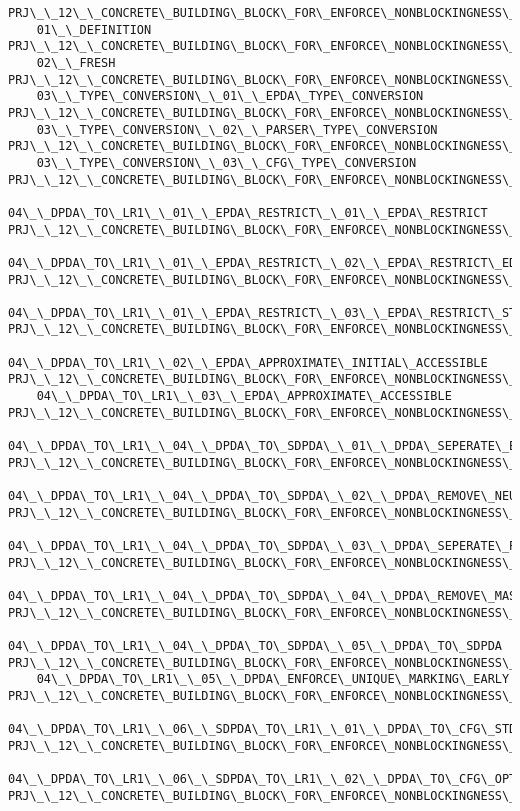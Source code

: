 \begin{verbatim}
PRJ\_\_12\_\_CONCRETE\_BUILDING\_BLOCK\_FOR\_ENFORCE\_NONBLOCKINGNESS\_\_    
    01\_\_DEFINITION
PRJ\_\_12\_\_CONCRETE\_BUILDING\_BLOCK\_FOR\_ENFORCE\_NONBLOCKINGNESS\_\_    
    02\_\_FRESH
PRJ\_\_12\_\_CONCRETE\_BUILDING\_BLOCK\_FOR\_ENFORCE\_NONBLOCKINGNESS\_\_    
    03\_\_TYPE\_CONVERSION\_\_01\_\_EPDA\_TYPE\_CONVERSION
PRJ\_\_12\_\_CONCRETE\_BUILDING\_BLOCK\_FOR\_ENFORCE\_NONBLOCKINGNESS\_\_    
    03\_\_TYPE\_CONVERSION\_\_02\_\_PARSER\_TYPE\_CONVERSION
PRJ\_\_12\_\_CONCRETE\_BUILDING\_BLOCK\_FOR\_ENFORCE\_NONBLOCKINGNESS\_\_    
    03\_\_TYPE\_CONVERSION\_\_03\_\_CFG\_TYPE\_CONVERSION
PRJ\_\_12\_\_CONCRETE\_BUILDING\_BLOCK\_FOR\_ENFORCE\_NONBLOCKINGNESS\_\_
    04\_\_DPDA\_TO\_LR1\_\_01\_\_EPDA\_RESTRICT\_\_01\_\_EPDA\_RESTRICT
PRJ\_\_12\_\_CONCRETE\_BUILDING\_BLOCK\_FOR\_ENFORCE\_NONBLOCKINGNESS\_\_
    04\_\_DPDA\_TO\_LR1\_\_01\_\_EPDA\_RESTRICT\_\_02\_\_EPDA\_RESTRICT\_EDGES
PRJ\_\_12\_\_CONCRETE\_BUILDING\_BLOCK\_FOR\_ENFORCE\_NONBLOCKINGNESS\_\_
    04\_\_DPDA\_TO\_LR1\_\_01\_\_EPDA\_RESTRICT\_\_03\_\_EPDA\_RESTRICT\_STATES
PRJ\_\_12\_\_CONCRETE\_BUILDING\_BLOCK\_FOR\_ENFORCE\_NONBLOCKINGNESS\_\_
    04\_\_DPDA\_TO\_LR1\_\_02\_\_EPDA\_APPROXIMATE\_INITIAL\_ACCESSIBLE
PRJ\_\_12\_\_CONCRETE\_BUILDING\_BLOCK\_FOR\_ENFORCE\_NONBLOCKINGNESS\_\_
    04\_\_DPDA\_TO\_LR1\_\_03\_\_EPDA\_APPROXIMATE\_ACCESSIBLE
PRJ\_\_12\_\_CONCRETE\_BUILDING\_BLOCK\_FOR\_ENFORCE\_NONBLOCKINGNESS\_\_
    04\_\_DPDA\_TO\_LR1\_\_04\_\_DPDA\_TO\_SDPDA\_\_01\_\_DPDA\_SEPERATE\_EXECUTING\_EDGES
PRJ\_\_12\_\_CONCRETE\_BUILDING\_BLOCK\_FOR\_ENFORCE\_NONBLOCKINGNESS\_\_
    04\_\_DPDA\_TO\_LR1\_\_04\_\_DPDA\_TO\_SDPDA\_\_02\_\_DPDA\_REMOVE\_NEUTRAL\_EDGES
PRJ\_\_12\_\_CONCRETE\_BUILDING\_BLOCK\_FOR\_ENFORCE\_NONBLOCKINGNESS\_\_
    04\_\_DPDA\_TO\_LR1\_\_04\_\_DPDA\_TO\_SDPDA\_\_03\_\_DPDA\_SEPERATE\_PUSH\_AND\_POP\_EDGES
PRJ\_\_12\_\_CONCRETE\_BUILDING\_BLOCK\_FOR\_ENFORCE\_NONBLOCKINGNESS\_\_
    04\_\_DPDA\_TO\_LR1\_\_04\_\_DPDA\_TO\_SDPDA\_\_04\_\_DPDA\_REMOVE\_MASS\_PUSHING\_EDGES
PRJ\_\_12\_\_CONCRETE\_BUILDING\_BLOCK\_FOR\_ENFORCE\_NONBLOCKINGNESS\_\_
    04\_\_DPDA\_TO\_LR1\_\_04\_\_DPDA\_TO\_SDPDA\_\_05\_\_DPDA\_TO\_SDPDA
PRJ\_\_12\_\_CONCRETE\_BUILDING\_BLOCK\_FOR\_ENFORCE\_NONBLOCKINGNESS\_\_
    04\_\_DPDA\_TO\_LR1\_\_05\_\_DPDA\_ENFORCE\_UNIQUE\_MARKING\_EARLY
PRJ\_\_12\_\_CONCRETE\_BUILDING\_BLOCK\_FOR\_ENFORCE\_NONBLOCKINGNESS\_\_
    04\_\_DPDA\_TO\_LR1\_\_06\_\_SDPDA\_TO\_LR1\_\_01\_\_DPDA\_TO\_CFG\_STD
PRJ\_\_12\_\_CONCRETE\_BUILDING\_BLOCK\_FOR\_ENFORCE\_NONBLOCKINGNESS\_\_
    04\_\_DPDA\_TO\_LR1\_\_06\_\_SDPDA\_TO\_LR1\_\_02\_\_DPDA\_TO\_CFG\_OPT
PRJ\_\_12\_\_CONCRETE\_BUILDING\_BLOCK\_FOR\_ENFORCE\_NONBLOCKINGNESS\_\_

\end{verbatim}
